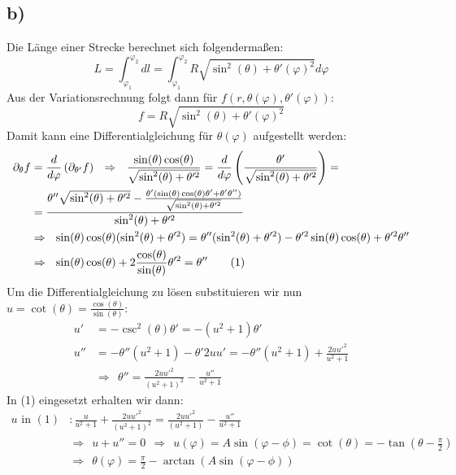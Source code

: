 \documentclass[a4paper,12pt]{article}
\newcommand\numberthis{\addtocounter{equation}{1}\tag{\theequation}}
\begin{document}
\subsection*{b)}
Die Länge einer Strecke berechnet sich folgendermaßen:
$$ L=\int_{\varphi_1}^{\varphi_2}dl=\int_{\varphi_1}^{\varphi_2} R\sqrt{\sin^2(\theta)+\theta'(\varphi)^2} d\varphi $$
Aus der Variationsrechnung folgt dann für $f(r, \theta(\varphi),  \theta'(\varphi))$:
$$f=R\sqrt{\sin^2(\theta)+\theta'(\varphi)^2}$$
Damit kann eine Differentialgleichung für $\theta(\varphi)$ aufgestellt werden:
\begin{align*}
\partial_{\theta}f&=\frac{d}{d\varphi}\left(\partial_{\theta'}f \right)\ \ \Rightarrow\ \ \frac{\sin(\theta)\cos(\theta)}{\sqrt{\sin^2(\theta)+\theta'^2}}=\frac{d}{d\varphi}\left( \frac{\theta'}{\sqrt{\sin^2(\theta)+\theta'^2}} \right)= \\
&=\frac{\theta''\sqrt{\sin^2(\theta)+\theta'^2}-\frac{\theta'(\sin(\theta)\cos(\theta)\theta'+\theta'\theta'')}{\sqrt{\sin^2(\theta)+\theta'^2}}}{\sin^2(\theta)+\theta'^2}\\
&\Rightarrow\ \ \sin(\theta)\cos(\theta)(\sin^2(\theta)+\theta'^2) = \theta''(\sin^2(\theta)+\theta'^2)-\theta'^2\sin(\theta)\cos(\theta)+\theta'^2\theta''\\
&\Rightarrow\ \ \sin(\theta)\cos(\theta) + 2\frac{\cos(\theta)}{\sin(\theta)}\theta'^2=\theta'' \numberthis\label{DGL_theta}
\end{align*}
Um die Differentialgleichung zu lösen substituieren wir nun $u=\cot(\theta) = \frac{\cos(\theta)}{\sin(\theta)}$:
\begin{align*}
u'&=-\csc^2(\theta)\theta'=-(u^2+1)\theta'\\
u''&=-\theta''(u^2+1)-\theta'2uu'=-\theta''(u^2+1)+\frac{2uu'^2}{u^2+1}\\
&\Rightarrow\ \ \theta'' = \frac{2uu'^2}{(u^2+1)^2}-\frac{u''}{u^2+1}
\end{align*}
In (1) eingesetzt erhalten wir dann:
\begin{align*}
u \textrm{ in } (1)&: \frac{u}{u^2+1} + \frac{2uu'^2}{(u^2+1)^2} = \frac{2uu'^2}{(u^2+1)}-\frac{u''}{u^2+1}\\
&\Rightarrow\ \ u+u''=0\ \ \Rightarrow\ \ u(\varphi)=A\sin(\varphi-\phi) = \cot(\theta) = -\tan(\theta-\frac{\pi}{2})\\
&\Rightarrow\ \ \theta(\varphi)=\frac{\pi}{2}-\arctan(A\sin(\varphi-\phi))
\end{align*}
\end{document}
